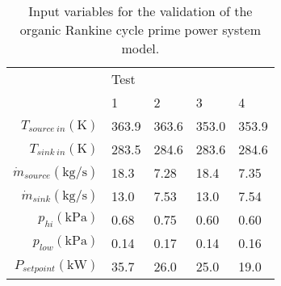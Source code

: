 \begin{table}[h]
	\centering
	\caption{Input variables for the validation of the organic Rankine cycle prime power system model.}
	\label{tab:verification_ORC_vars}
	\begin{tabular}{rllll}
		\toprule
		                                              &  Test &       &       &       \\ \cline{2-5}
		                                              &     1 &     2 &     3 &     4 \\ \midrule
		$T_{source\ in}(\si{\kelvin})$                & 363.9 & 363.6 & 353.0 & 353.9 \\
		$T_{sink\ in}(\si{\kelvin})$                  & 283.5 & 284.6 & 283.6 & 284.6 \\
		$\dot{m}_{source}(\si{\kilogram\per\second})$ &  18.3 &  7.28 &  18.4 &  7.35 \\
		$\dot{m}_{sink}(\si{\kilogram\per\second})$   &  13.0 &  7.53 &  13.0 &  7.54 \\
		$p_{hi}(\si{\kilo\pascal})  $                 &  0.68 &  0.75 &  0.60 &  0.60 \\
		$p_{low}(\si{\kilo\pascal}) $                 &  0.14 &  0.17 &  0.14 &  0.16 \\
		$P_{setpoint}(\si{\kilo\watt})$               &  35.7 &  26.0 &  25.0 &  19.0 \\ 
		\bottomrule
	\end{tabular}
\end{table}

